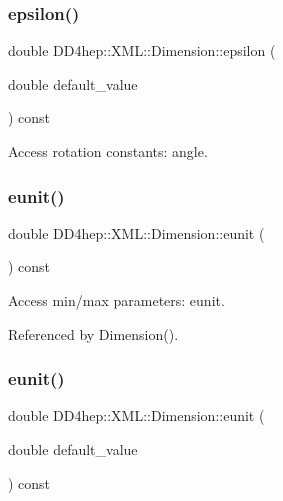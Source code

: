 \subsubsection{\texorpdfstring{epsilon()}{epsilon()}\hspace{0.1cm}{\footnotesize\ttfamily [2/2]}}
{\footnotesize\ttfamily double D\+D4hep\+::\+X\+M\+L\+::\+Dimension\+::epsilon (\begin{DoxyParamCaption}\item[{double}]{default\+\_\+value }\end{DoxyParamCaption}) const}



Access rotation constants\+: angle. 

\hypertarget{struct_d_d4hep_1_1_x_m_l_1_1_dimension_a29cc95940643b5890265b41487c05905}{}\label{struct_d_d4hep_1_1_x_m_l_1_1_dimension_a29cc95940643b5890265b41487c05905} 
\subsubsection{\texorpdfstring{eunit()}{eunit()}\hspace{0.1cm}{\footnotesize\ttfamily [1/2]}}
{\footnotesize\ttfamily double D\+D4hep\+::\+X\+M\+L\+::\+Dimension\+::eunit (\begin{DoxyParamCaption}{ }\end{DoxyParamCaption}) const}



Access min/max parameters\+: eunit. 



Referenced by Dimension().

\hypertarget{struct_d_d4hep_1_1_x_m_l_1_1_dimension_a4d44ba95a7d22dde526cff35d12a607e}{}\label{struct_d_d4hep_1_1_x_m_l_1_1_dimension_a4d44ba95a7d22dde526cff35d12a607e} 
\subsubsection{\texorpdfstring{eunit()}{eunit()}\hspace{0.1cm}{\footnotesize\ttfamily [2/2]}}
{\footnotesize\ttfamily double D\+D4hep\+::\+X\+M\+L\+::\+Dimension\+::eunit (\begin{DoxyParamCaption}\item[{double}]{default\+\_\+value }\end{DoxyParamCaption}) const}




